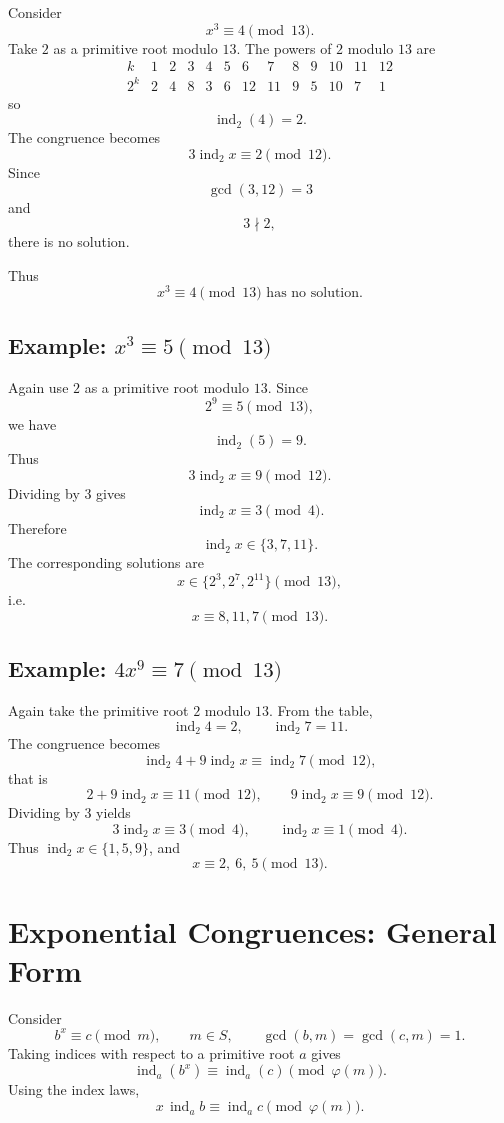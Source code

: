 \documentclass[11pt]{article}
\theoremstyle{remark}
\DeclareMathOperator{\gcdop}{gcd}
\DeclareMathOperator{\ind}{ind}
\newcommand{\phiE}{\varphi}
\begin{document}
Consider
\[
    x^3\equiv4\pmod{13}.
\]
Take $2$ as a primitive root modulo $13$. The powers of $2$ modulo $13$
are
\[
\begin{array}{c|cccccccccccc}
k&1&2&3&4&5&6&7&8&9&10&11&12\\
\hline
2^k&2&4&8&3&6&12&11&9&5&10&7&1
\end{array}
\]
so
\[
    \ind_2(4)=2.
\]
The congruence becomes
\[
    3\ind_2 x\equiv2\pmod{12}.
\]
Since
\[
    \gcdop(3,12)=3
\]
and
\[
    3\nmid2,
\]
there is no solution.

Thus
\[
    \boxed{x^3\equiv4\pmod{13}\text{ has no solution}.}
\]

\subsection{Example: $x^3\equiv5\pmod{13}$}

Again use $2$ as a primitive root modulo $13$. Since
\[
    2^9\equiv5\pmod{13},
\]
we have
\[
    \ind_2(5)=9.
\]
Thus
\[
    3\ind_2 x\equiv9\pmod{12}.
\]
Dividing by $3$ gives
\[
    \ind_2 x\equiv3\pmod4.
\]
Therefore
\[
    \ind_2 x\in\{3,7,11\}.
\]
The corresponding solutions are
\[
    x\in\{2^3,2^7,2^{11}\}\pmod{13},
\]
i.e.
\[
    \boxed{x\equiv8,11,7\pmod{13}.}
\]

\subsection{Example: $4x^9\equiv 7\pmod{13}$}

Again take the primitive root $2$ modulo $13$. From the table,
\[
    \ind_2 4=2,
    \qquad
    \ind_2 7=11.
\]
The congruence becomes
\[
    \ind_2 4+9\ind_2 x\equiv\ind_2 7\pmod{12},
\]
that is
\[
    2+9\ind_2 x\equiv 11\pmod{12},
    \qquad
    9\ind_2 x\equiv 9\pmod{12}.
\]
Dividing by $3$ yields
\[
    3\ind_2 x\equiv 3\pmod 4,
    \qquad
    \ind_2 x\equiv 1\pmod 4.
\]
Thus $\ind_2 x\in\{1,5,9\}$, and
\[
    \boxed{x\equiv 2,\ 6,\ 5\pmod{13}.}
\]

\section{Exponential Congruences: General Form}

Consider
\[
    b^x\equiv c\pmod m,
    \qquad
    m\in S,
    \qquad
    \gcdop(b,m)=\gcdop(c,m)=1.
\]
Taking indices with respect to a primitive root $a$ gives
\[
    \ind_a(b^x)
    \equiv
    \ind_a(c)
    \pmod{\phiE(m)}.
\]
Using the index laws,
\[
    x\,\ind_a b
    \equiv
    \ind_a c
    \pmod{\phiE(m)}.
\]
\end{document}
